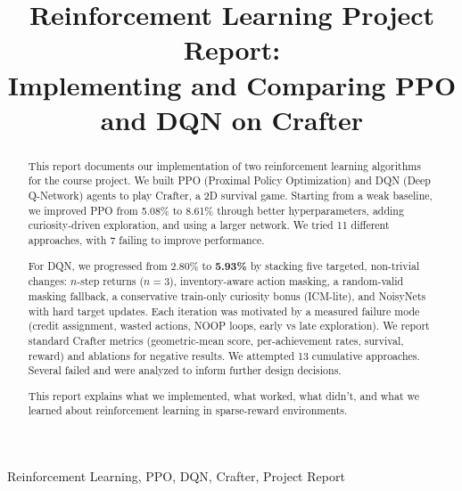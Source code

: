 \documentclass[conference]{IEEEtran}
\begin{document}
\title{Reinforcement Learning Project Report:\\Implementing and Comparing PPO and DQN on Crafter}

\author{
    \and
}

\maketitle

\begin{abstract}
This report documents our implementation of two reinforcement learning algorithms for the course project. We built PPO (Proximal Policy Optimization) and DQN (Deep Q-Network) agents to play Crafter, a 2D survival game. Starting from a weak baseline, we improved PPO from 5.08\% to 8.61\% through better hyperparameters, adding curiosity-driven exploration, and using a larger network. We tried 11 different approaches, with 7 failing to improve performance. 

For DQN, we progressed from 2.80\% to \textbf{5.93\%} by stacking five targeted, non-trivial changes: $n$-step returns ($n{=}3$), inventory-aware action masking, a random-valid masking fallback, a conservative train-only curiosity bonus (ICM-lite), and NoisyNets with hard target updates. Each iteration was motivated by a measured failure mode (credit assignment, wasted actions, NOOP loops, early vs late exploration). We report standard Crafter metrics (geometric-mean score, per-achievement rates, survival, reward) and ablations for negative results. We attempted 13 cumulative approaches. Several failed and were analyzed to inform further design decisions.

This report explains what we implemented, what worked, what didn't, and what we learned about reinforcement learning in sparse-reward environments.
\end{abstract}

\begin{IEEEkeywords}
Reinforcement Learning, PPO, DQN, Crafter, Project Report
\end{IEEEkeywords}
\end{document}
